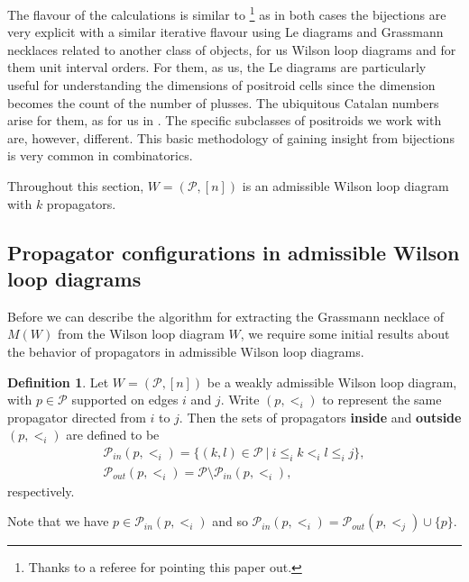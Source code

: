 \documentclass[11pt]{article}
\newcommand{\note}{\todo[color=green!40]}
\newcommand{\cP}{\mathcal{P}}
\theoremstyle{remark}
\theoremstyle{definition}
\newtheorem{dfn}[thm]{Definition}
\begin{document}
The flavour of the calculations is similar to \cite{CGdyck}\footnote{Thanks to a referee for pointing this paper out.} as in both cases the bijections are very explicit with a similar iterative flavour using Le diagrams and Grassmann necklaces related to another class of objects, for us Wilson loop diagrams and for them unit interval orders.  For them, as us, the Le diagrams are particularly useful for understanding the dimensions of positroid cells since the dimension becomes the count of the number of plusses.  The ubiquitous Catalan numbers arise for them, as for us in \cite{generalcombinatoricsI}.  The specific subclasses of positroids we work with are, however, different.  This basic methodology of gaining insight from bijections is very common in combinatorics.




Throughout this section, $W = (\cP,[n])$ is an admissible Wilson loop diagram with $k$ propagators.





\subsection{Propagator configurations in admissible Wilson loop diagrams}\label{sec:propagator configs}

Before we can describe the algorithm for extracting the Grassmann necklace of $M(W)$ from the Wilson loop diagram $W$, we require some initial results about the behavior of propagators in admissible Wilson loop diagrams.



\begin{dfn}\label{props inside p}
Let $W = (\cP, [n])$ be a weakly admissible Wilson loop diagram, with $p \in \cP$ supported on edges $i$ and $j$. Write $(p, <_i)$ to represent the same propagator directed from $i$ to $j$. Then the sets of propagators {\bf inside} and {\bf outside}  $(p,<_i)$ are defined to be
\begin{gather*}\cP_{in}(p,<_i) = \{ (k,l) \in \cP \ |\ i \leq_i k <_i l \leq_i j \}, \\
\cP_{out}(p,<_i) = \cP\setminus \cP_{in}(p,<_i),
\end{gather*}
respectively.
\end{dfn}
Note that we have $p\in \cP_{in}(p, <_i)$ and so $\cP_{in}(p, <_i) = \cP_{out}(p, <_j)\cup\{p\}$.
\end{document}

